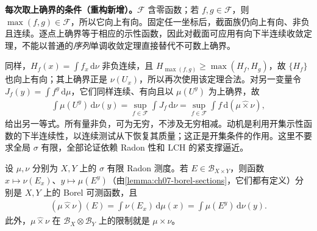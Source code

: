 \documentclass[../../main.tex]{subfiles}
\begin{document}
\begin{remark}
\textbf{每次取上确界的条件（重构新增）。}$\mathcal F$ 含零函数；若 $f,g\in\mathcal F$，则 $\max(f,g)\in\mathcal F$，所以它向上有向。固定任一坐标后，截面族仍向上有向、非负且连续。逐点上确界等于相应的示性函数，因此对截面可应用有向下半连续收敛定理，不能以普通的\emph{序列}单调收敛定理直接替代不可数上确界。

同样，$H_f(x)=\int f_x\,\mathrm d\nu$ 非负连续，且 $H_{\max(f,g)}\geqslant\max(H_f,H_g)$，故 $\{H_f\}$ 也向上有向；其上确界正是 $\nu(U_x)$，所以再次使用该定理合法。对另一变量令 $J_f(y)=\int f^y\,\mathrm d\mu$，它们同样连续、有向且以 $\mu(U^y)$ 为上确界，故
\begin{align*}
\int\mu(U^y)\,\mathrm d\nu(y)
=\sup_{f\in\mathcal F}\int J_f\,\mathrm d\nu
=\sup_{f\in\mathcal F}\int f\,\mathrm d(\mu\mathbin{\widehat\times}\nu),
\end{align*}
给出另一等式。所有量非负，可为无穷，不涉及无穷相减。动机是利用开集示性函数的下半连续性，以连续测试从下恢复其质量；这正是开集条件的作用。这里不要求全局 $\sigma$ 有限，全部论证依赖 Radon 性和 LCH 的紧支撑逼近。
\end{remark}
\begin{theorem}\label{theorem:ch07-borel-product-integrals}
设 $\mu,\nu$ 分别为 $X,Y$ 上的 $\sigma$ 有限 Radon 测度。若 $E\in\mathscr B_{X\times Y}$，则函数 $x\mapsto\nu(E_x)$、$y\mapsto\mu(E^y)$（由\cref{lemma:ch07-borel-sections}，它们都有定义）分别是 $X,Y$ 上的 Borel 可测函数，且
\begin{align*}
(\mu\mathbin{\widehat\times}\nu)(E)=\int\nu(E_x)\,\mathrm d\mu(x)
=\int\mu(E^y)\,\mathrm d\nu(y).
\end{align*}
此外，$\mu\mathbin{\widehat\times}\nu$ 在 $\mathscr B_X\otimes\mathscr B_Y$ 上的限制就是 $\mu\times\nu$。
\end{theorem}
\end{document}
